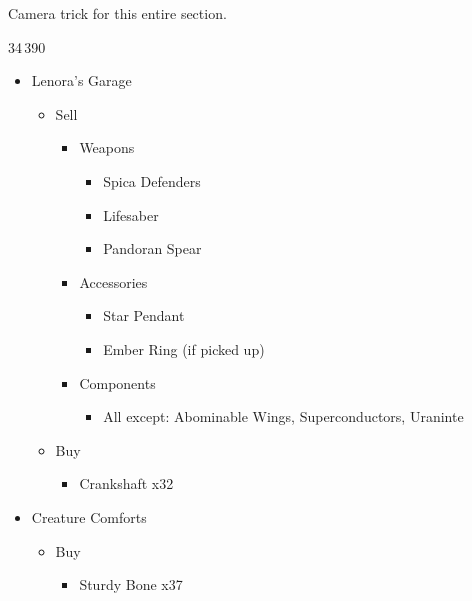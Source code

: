 	Camera trick for this entire section.
	\vfill

	\begin{shop}{34\,390}
		\begin{itemize}
			\item Lenora's Garage
			      \begin{itemize}
				      \item Sell
				            \begin{itemize}
					            \item Weapons
					                  \begin{itemize}
						                  \item Spica Defenders
						                  \item Lifesaber
						                  \item Pandoran Spear
					                  \end{itemize}
					            \item Accessories
					                  \begin{itemize}
						                  \item Star Pendant
						                  \item Ember Ring (if picked up)
					                  \end{itemize}
					            \item Components
					                  \begin{itemize}
						                  \item All except: Abominable Wings, Superconductors, Uraninte
					                  \end{itemize}
				            \end{itemize}
				      \item Buy
				            \begin{itemize}
					            \item Crankshaft x32
				            \end{itemize}
			      \end{itemize}
			\item Creature Comforts
			      \begin{itemize}
				      \item Buy
				            \begin{itemize}
					            \item Sturdy Bone x37
				            \end{itemize}
			      \end{itemize}

\end{itemize}
\end{shop}
